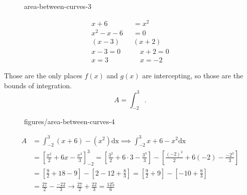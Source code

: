 \documentclass{book}
\begin{document}

\begin{figure}[htbp]
    \centering
    \caption{area-between-curves-3}
    \label{fig:area-between-curves-3}
\end{figure}    


\begin{align*}
    x+6&= x^2 \\
    x^2-x-6&= 0 \\
    \left( x-3 \right)&  \left( x+2 \right) \\ 
    x-3 = 0 \quad &\quad  x+2 = 0\\
    x=3 \quad&\quad x=-2
\end{align*}

Those are the only places $f(x)$ and  $g(x)$ are intercepting, so those are the bounds of integration.
\[
A=\int_{-2}^{3}  
.\] 


\begin{figure}[htbp]
    \centering
    \caption{figures/area-between-curves-4}
    \label{fig:area-between-curves-4}
\end{figure}

\begin{align*}
    A&= \int_{-2}^{3} \left( x+6 \right) -(x^2) \text{dx} \implies \int_{-2}^{3} x+6-x^2 \text{dx}   \\
    &= \left[ \frac{x^2}{2}+6x -\frac{x^3}{3}\right]_{-2}^3 = \left[
    \frac{3^2}{2}+6\cdot 3-\frac{3^3}{3} \right] - \left[
\frac{(-2)^2}{2}+6(-2)-\frac{-2^3}{3} \right]  \\
&= \left[  \frac{9}{2}+18-9  \right]-\left[ 2-12+\frac{8}{3} \right]=\left[ \frac{9}{2}+9 \right] -\left[ -10+\frac{8}{3} \right]  \\
&= \frac{27}{2}-\frac{-22}{3}\to \frac{27}{2}+\frac{22}{3}= \frac{125}{6} \\
\end{align*}
\end{document}
